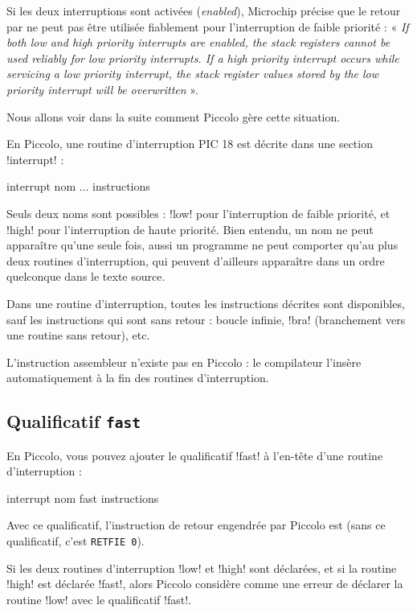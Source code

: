 Si les deux interruptions sont activées (\emph{enabled}), Microchip précise que le retour par  ne peut pas être utilisée fiablement pour l’interruption de faible priorité : « \emph{If both low and high priority interrupts are enabled, the stack registers cannot be used reliably for low priority interrupts. If a high priority interrupt occurs while servicing a low priority interrupt, the stack register values stored by the low priority interrupt will be overwritten} ».

Nous allons voir dans la suite comment Piccolo gère cette situation.

En Piccolo, une routine d’interruption PIC 18 est décrite dans une section \pic!interrupt! :

\begin{piccolo}
interrupt nom ... {
 instructions
}
\end{piccolo}

Seuls deux noms sont possibles : \pic!low! pour l’interruption de faible priorité, et \pic!high! pour l’interruption de haute priorité. Bien entendu, un nom ne peut apparaître qu’une seule fois, aussi un programme ne peut comporter qu'au plus deux routines d'interruption, qui peuvent d'ailleurs apparaître dans un ordre quelconque dans le texte source.

Dans une routine d'interruption, toutes les instructions décrites sont disponibles, sauf les instructions qui sont sans retour : boucle infinie, \pic!bra! (branchement vers une routine sans retour), etc.

L’instruction assembleur  n’existe pas en Piccolo : le compilateur l’insère automatiquement à la fin des routines d’interruption.



\subsection{Qualificatif \texttt{fast}}

En Piccolo, vous pouvez ajouter le qualificatif \pic!fast! à l’en-tête d’une routine d’interruption :

\begin{piccolo}
interrupt nom fast {
 instructions
}
\end{piccolo}

Avec ce qualificatif, l’instruction de retour engendrée par Piccolo est  (sans ce qualificatif, c’est \texttt{RETFIE 0}).

Si les deux routines d’interruption \pic!low! et \pic!high! sont déclarées, et si la routine \pic!high! est déclarée \pic!fast!, alors Piccolo considère comme une erreur de déclarer la routine \pic!low! avec le qualificatif \pic!fast!.






